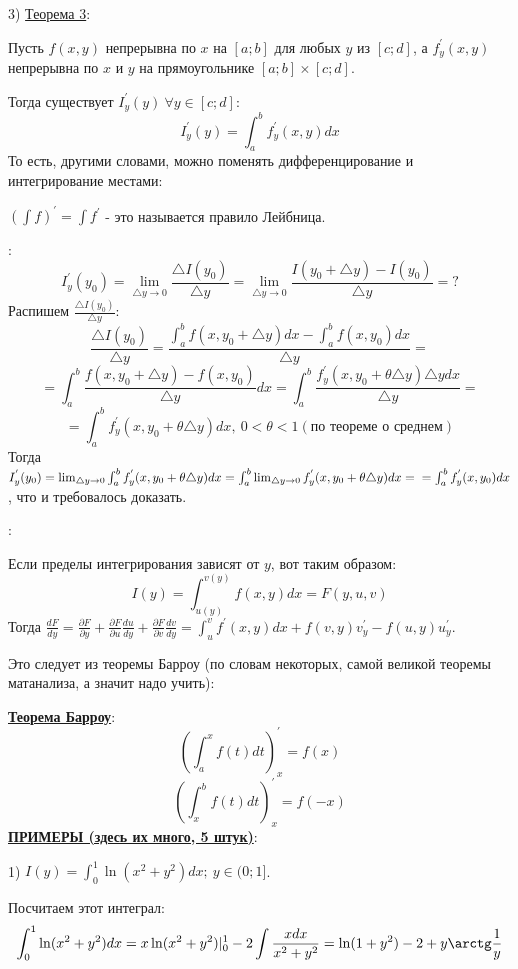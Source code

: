 \documentclass[12pt]{article}
\begin{document}
3) \uline{Теорема 3}:\par
Пусть $f(x,y)$ непрерывна по $x$ на $[a;b]$ для любых $y$ из $[c;d]$, а $f^{'}_y(x,y)$ непрерывна по $x$ и $y$ на прямоугольнике $[a;b] \times [c;d]$.\par
Тогда существует $I^{'}_y (y) \ \forall y\in [c;d]$:
$$I^{'}_y (y) = \int_a^b f^{'}_y (x,y) dx$$
То есть, другими словами, можно поменять дифференцирование и интегрирование местами:\par
$(\int f)^{'} = \int f^{'}$ - это называется правило Лейбница.\par
{}:
$$I^{'}_y(y_0) = \lim_{{\bigtriangleup y} \to 0} \frac{{\bigtriangleup I(y_0)}}{{\bigtriangleup y}} = \lim_{{\bigtriangleup y} \to 0} \frac{I(y_0+{\bigtriangleup y}) - I(y_0)}{{\bigtriangleup y}} = ?$$
Распишем $\frac{{\bigtriangleup I(y_0)}}{{\bigtriangleup y}}$:
$$\frac{{\bigtriangleup I(y_0)}}{{\bigtriangleup y}} = \frac{\int_a^b f(x, y_0 + {\bigtriangleup y}) dx - \int_a^b f(x,y_0) dx}{{\bigtriangleup y}} =$$
$$= \int_a^b \frac{f(x,y_0+{\bigtriangleup y}) - f(x,y_0)}{{\bigtriangleup y}} dx = \int_a^b \frac{f^{'}_y (x, y_0 + \theta {\bigtriangleup y}) {\bigtriangleup y} dx}{{\bigtriangleup y}} =$$
$$= \int_a^b f^{'}_y (x, y_0 + \theta {\bigtriangleup y}) dx, \ 0 < \theta < 1 (\text{по теореме о среднем})$$
Тогда $I^{'}_y (y_0) = \lim_{{\bigtriangleup y} \to 0} \int_a^b f^{'}_y (x, y_0 + \theta {\bigtriangleup y}) dx = \int_a^b \lim_{{\bigtriangleup y} \to 0}  f^{'}_y (x, y_0 + \theta {\bigtriangleup y}) dx =\\= \int_a^b f^{'}_y (x,y_0) dx$, что и требовалось доказать.\par
{}:\par
Если пределы интегрирования зависят от $y$, вот таким образом:
$$I(y) = \int_{u(y)}^{v(y)} f(x,y) dx = F(y,u,v)$$
Тогда $\frac{dF}{dy} = \frac{\partial F}{\partial y} + \frac{\partial F}{\partial u} \frac{du}{dy} + \frac{\partial F}{\partial v} \frac{dv}{dy} = \int_u^v f^{'}(x,y) dx + f(v,y) v^{'}_y - f(u,y) u^{'}_y$.\par
Это следует из теоремы Барроу (по словам некоторых, самой великой теоремы матанализа, а значит надо учить):\par
\uline{\textbf{Теорема Барроу}}:
$$(\int_a^x f(t) dt)^{'}_x = f(x)$$
$$(\int_x^b f(t) dt)^{'}_x = f(-x)$$
\uline{\textbf{ПРИМЕРЫ (здесь их много, 5 штук)}}:\par
1) $I(y) = \int_0^1 \ln(x^2+y^2) dx; \ y\in (0;1]$.\par
Посчитаем этот интеграл:
$$\int_0^1 \ln (x^2+y^2) dx = x \ln (x^2 + y^2) |_0^1 - 2 \int \frac{xdx}{x^2+y^2} = \ln (1+y^2) - 2 + y \arctg \frac{1}{y}$$
\end{document}
